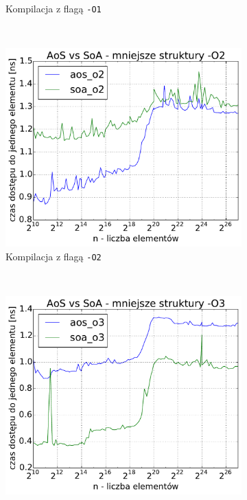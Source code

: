 \begin{figure}
\begin{subfigure}[c]{0.45\textwidth}
        \caption{Kompilacja z flagą \texttt{-O1}}
    \end{subfigure}
    \\
    \vspace{0.55cm}
    \begin{subfigure}[c]{0.45\textwidth}
        \centering
        \includegraphics[width=\textwidth]{images/benchs_xeon/compact_aos_vs_soa_O2}
        \caption{Kompilacja z flagą \texttt{-O2}}
    \end{subfigure}
    ~
    \begin{subfigure}[c]{0.45\textwidth}
        \centering
        \includegraphics[width=\textwidth]{images/benchs_xeon/compact_aos_vs_soa_O3}

\end{subfigure}
\end{figure}
